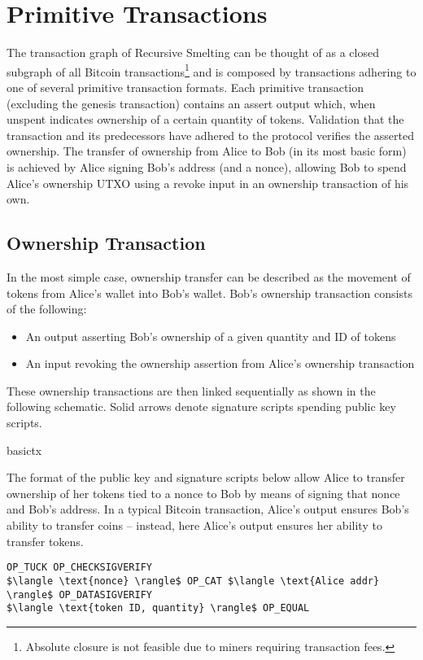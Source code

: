 \documentclass[9pt,oneside]{amsart}
\begin{document}
\section{Primitive Transactions}\label{sec:primtrans}
The transaction graph of Recursive Smelting can be thought of as a closed subgraph of all Bitcoin transactions\footnote{Absolute closure is not feasible due to miners requiring transaction fees.} and is composed by transactions adhering to one of several primitive transaction formats. Each primitive transaction (excluding the genesis transaction) contains an assert output which, when unspent indicates ownership of a certain quantity of tokens.  Validation that the transaction and its predecessors have adhered to the protocol verifies the asserted ownership. The transfer of ownership from Alice to Bob (in its most basic form) is achieved by Alice signing Bob's address (and a nonce), allowing Bob to spend Alice's ownership UTXO using a revoke input in an ownership transaction of his own.

\subsection{Ownership Transaction}\label{subsec:basicownershiptx}
In the most simple case, ownership transfer can be described as the movement of tokens from Alice's wallet into Bob's wallet. Bob's ownership transaction consists of the following:
\begin{itemize}
    \item An output asserting Bob's ownership of a given quantity and ID of tokens
    \item An input revoking the ownership assertion from Alice's ownership transaction
\end{itemize}

These ownership transactions are then linked sequentially as shown in the following schematic. Solid arrows denote signature scripts spending public key scripts.
\begin{center}
{basictx}
\end{center}

The format of the public key and signature scripts below allow Alice to transfer ownership of her tokens tied to a nonce to Bob by means of signing that nonce and Bob's address. In a typical Bitcoin transaction, Alice's output ensures Bob's ability to transfer coins -- instead, here Alice's output ensures her ability to transfer tokens.

\begin{lstlisting}[title={\textbf{Alice's Assert PubKey Script}}]
OP_TUCK OP_CHECKSIGVERIFY
$\langle \text{nonce} \rangle$ OP_CAT $\langle \text{Alice addr} \rangle$ OP_DATASIGVERIFY
$\langle \text{token ID, quantity} \rangle$ OP_EQUAL
\end{lstlisting}
\end{document}
